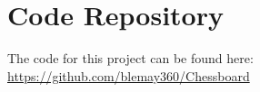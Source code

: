 \documentclass[journal]{IEEEtran}
\begin{document}
\appendices
\section{Code Repository}
\label{Github repo}
The code for this project can be found here: \url{https://github.com/blemay360/Chessboard}


\ifCLASSOPTIONcaptionsoff
  \newpage
\fi





\printbibliography

\end{document}
